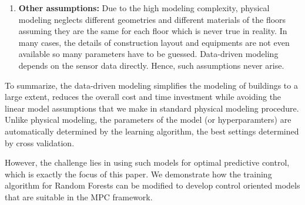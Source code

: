 \begin{enumerate}
	\item \textcolor[rgb]{0,0,1}{\textbf{Other assumptions:} 
	Due to the high modeling complexity, physical modeling neglects different geometries and different materials of the floors assuming they are the same for each floor which is never true in reality.
	In many cases, the details of construction layout and equipments are not even available so many parameters have to be guessed.
	Data-driven modeling depends on the sensor data directly. 
	Hence, such assumptions never arise.}
	
\end{enumerate}

\textcolor[rgb]{0,0,1}{To summarize, the data-driven modeling simplifies the modeling of buildings to a large extent, reduces the overall cost and time investment while avoiding the linear model assumptions that we make in standard physical modeling procedure. Unlike physical modeling, the parameters of the model (or hyperparamters) are automatically determined by the learning algorithm, the best settings determined by cross validation.}

\textcolor[rgb]{0,0,1}{However, the challenge lies in using such models for optimal predictive control, which is exactly the focus of this paper.
We demonstrate how the training algorithm for Random Forests can be modified to develop control oriented models that are suitable in the MPC framework.}

